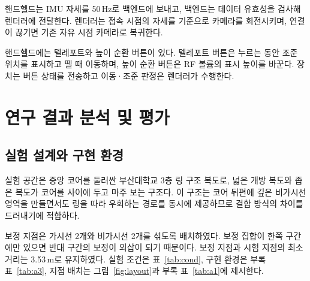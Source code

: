\documentclass[11pt,a4paper]{article}
\begin{document}
핸드헬드는 IMU 자세를 50\,Hz로 백엔드에 보내고, 백엔드는 데이터 유효성을 검사해 렌더러에 전달한다.
렌더러는 접속 시점의 자세를 기준으로 카메라를 회전시키며, 연결이 끊기면 기존 자유 시점 카메라로
복귀한다.

핸드헬드에는 텔레포트와 높이 순환 버튼이 있다. 텔레포트 버튼은 누르는 동안 조준 위치를 표시하고 뗄 때
이동하며, 높이 순환 버튼은 RF 볼륨의 표시 높이를 바꾼다. 장치는 버튼 상태를 전송하고 이동·조준 판정은
렌더러가 수행한다.

\section{연구 결과 분석 및 평가}

\subsection{실험 설계와 구현 환경}

실험 공간은 중앙 코어를 둘러싼 부산대학교 3층 링 구조 복도로, 넓은 개방 복도와 좁은 복도가 코어를 사이에
두고 마주 보는 구조다. 이 구조는 코어 뒤편에 깊은 비가시선 영역을 만들면서도 링을 따라 우회하는 경로를
동시에 제공하므로 결합 방식의 차이를 드러내기에 적합하다.

보정 지점은 가시선 2개와 비가시선 2개를 섞도록 배치하였다. 보정 집합이 한쪽 구간에만 있으면 반대 구간의
보정이 외삽이 되기 때문이다. 보정 지점과 시험 지점의 최소 거리는 3.53\,m로 유지하였다. 실험 조건은
표~\ref{tab:cond}, 구현 환경은 부록 표~\ref{tab:a3}, 지점 배치는 그림~\ref{fig:layout}과 부록
표~\ref{tab:a1}에 제시한다.
\end{document}
